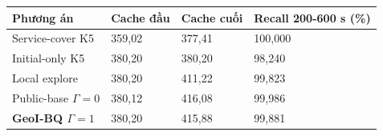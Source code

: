 \par\smallskip\noindent\begin{tabularx}{\linewidth}{@{}P{4.3cm}XXX@{}}\toprule
\textbf{Phương án} & \textbf{Cache đầu} & \textbf{Cache cuối} & \textbf{Recall 200-600 s (\%)} \\
\midrule
Service-cover K5 & 359{,}02 & 377{,}41 & 100{,}000 \\
Initial-only K5 & 380{,}20 & 380{,}20 & 98{,}240 \\
Local explore & 380{,}20 & 411{,}22 & 99{,}823 \\
Public-base $\Gamma=0$ & 380{,}12 & 416{,}08 & 99{,}986 \\
\textbf{GeoI-BQ $\Gamma=1$} & 380{,}20 & 415{,}88 & 99{,}881 \\
\bottomrule\end{tabularx}\par\smallskip
